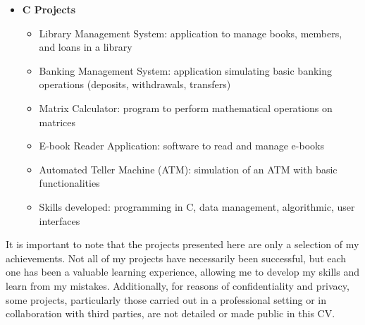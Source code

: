 \documentclass[letterpaper,11pt]{article}
\begin{document}
\begin{itemize}[label={}]
\item \textbf{C Projects}
\begin{itemize}
\item Library Management System: application to manage books, members, and loans in a library
\item Banking Management System: application simulating basic banking operations (deposits, withdrawals, transfers)
\item Matrix Calculator: program to perform mathematical operations on matrices
\item E-book Reader Application: software to read and manage e-books
\item Automated Teller Machine (ATM): simulation of an ATM with basic functionalities
\item Skills developed: programming in C, data management, algorithmic, user interfaces
\end{itemize}
\end{itemize}

It is important to note that the projects presented here are only a selection of my achievements. Not all of my projects have necessarily been successful, but each one has been a valuable learning experience, allowing me to develop my skills and learn from my mistakes. Additionally, for reasons of confidentiality and privacy, some projects, particularly those carried out in a professional setting or in collaboration with third parties, are not detailed or made public in this CV.
\end{document}
